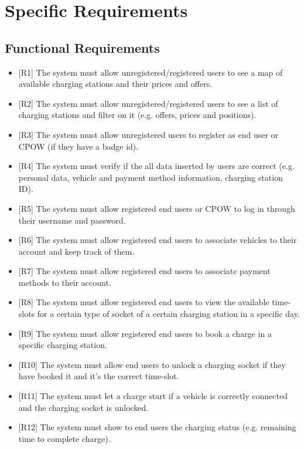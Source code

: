 \documentclass[a4paper]{report}
\begin{document}
\chapter{Specific Requirements}


\section{Functional Requirements}
\begin{itemize}
    \item{[R1]} \label{R1} The system must allow unregistered/registered users to see a map of available charging stations and their prices and offers.
    \item{[R2]} \label{R2} The system must allow unregistered/registered users to see a list of charging stations and filter on it (e.g. offers, prices and positions).
    \item{[R3]} \label{R3} The system must allow unregistered users to register as end user or CPOW (if they have a badge id).
    \item{[R4]} \label{R4} The system must verify if the all data inserted by users are correct (e.g. personal data, vehicle and payment method information, charging station ID).   
    \item{[R5]} \label{R5} The system must allow registered end users or CPOW to log in through their username and password.
    \item{[R6]} \label{R6} The system must allow registered end users to associate vehicles to their account and keep track of them.
    \item{[R7]} \label{R7} The system must allow registered end users to associate payment methods to their account.
    \item{[R8]} \label{R8} The system must allow registered end users to view the available time-slots for a certain type of socket of a certain charging station in a specific day.
    \item{[R9]} \label{R9} The system must allow registered end users to book a charge in a specific charging station.
    \item{[R10]} \label{R10} The system must allow end users to unlock a charging socket if they have booked it and it's the correct time-slot.
    \item{[R11]} \label{R11} The system must let a charge start if a vehicle is correctly connected and the charging socket is unlocked.
    \item{[R12]} \label{R12} The system must show to end users the charging status (e.g. remaining time to complete charge).

\end{itemize}
\end{document}
